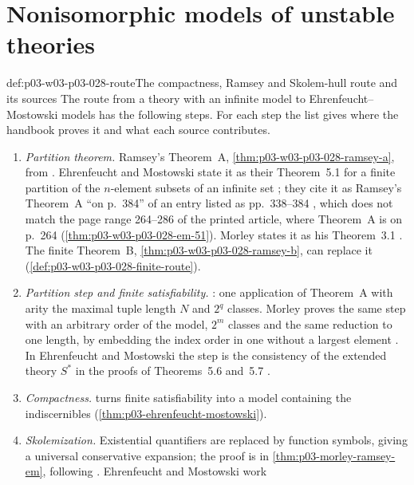 \section{Nonisomorphic models of unstable theories}
\label{sec:p03-w03-p03-028-spectrum}

\begin{hbmethod}{def:p03-w03-p03-028-route}{The compactness, Ramsey and Skolem-hull route and its sources}
The route from a theory with an infinite model to Ehrenfeucht--Mostowski
models has the following steps.  For each step the list gives where the
handbook proves it and what each source contributes.
\begin{enumerate}
\item \emph{Partition theorem.}  Ramsey's Theorem~A,
\cref{thm:p03-w03-p03-028-ramsey-a}, from \cite[pp.~264--266]{Ramsey1930}.
Ehrenfeucht and Mostowski state it as their Theorem~5.1 for a finite
partition of the \(n\)-element subsets of an infinite set
\cite[Theorem~5.1, p.~57]{EhrenfeuchtMostowski1956}; they cite it as
Ramsey's Theorem~A ``on p.~384'' of an entry listed as pp.~338--384
\cite[p.~68]{EhrenfeuchtMostowski1956}, which does not match the page range
264--286 of the printed article, where Theorem~A is on p.~264
(\cref{thm:p03-w03-p03-028-em-51}).  Morley
states it as his Theorem~3.1 \cite[Theorem~3.1, p.~525]{Morley1965}.  The
finite Theorem~B, \cref{thm:p03-w03-p03-028-ramsey-b}, can replace it
(\cref{def:p03-w03-p03-028-finite-route}).
\item \emph{Partition step and finite satisfiability.}
: one
application of Theorem~A with arity the maximal tuple length \(N\) and
\(2^q\) classes.  Morley proves the same step with an arbitrary order of
the model, \(2^m\) classes and the same reduction to one length, by
embedding the index order in one without a largest element
\cite[Theorem~3.2, pp.~525--526]{Morley1965}.  In Ehrenfeucht and Mostowski
the step is the consistency of the extended theory \(S^*\) in the proofs of
Theorems~5.6 and~5.7 \cite[pp.~60--65]{EhrenfeuchtMostowski1956}.
\item \emph{Compactness.}   turns finite
satisfiability into a model containing the indiscernibles
(\cref{thm:p03-ehrenfeucht-mostowski}).
\item \emph{Skolemization.}  Existential quantifiers are replaced by
function symbols, giving a universal conservative expansion; the proof is
in \cref{thm:p03-morley-ramsey-em}, following
\cite[Theorem~3.3, p.~526]{Morley1965}.  Ehrenfeucht and Mostowski work

\end{enumerate}
\end{hbmethod}
